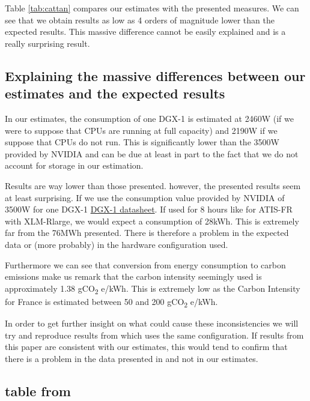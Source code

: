 \documentclass[11pt]{article}
\begin{document}
Table \ref{tab:cattan} compares our estimates with the presented
measures. We can see that we obtain results as low as 4 orders of magnitude
lower than the expected results. This massive difference cannot be
easily explained and is a really surprising result.

\subsection{Explaining the massive differences between our estimates and the expected results}
\label{sec:orgf6de9e8}

In our estimates, the consumption of one DGX-1 is estimated at
2460W (if we were to suppose that CPUs are running at full capacity)
and 2190W if we suppose that CPUs do not run. This is significantly lower than the 3500W provided by NVIDIA
and can be due at least in part to the fact that we do not account for
storage in our estimation.

Results are way lower than those presented. however, the presented
results seem at least surprising. If we use the consumption value
provided by NVIDIA of 3500W for one DGX-1 \href{https://www.nvidia.com/content/dam/en-zz/Solutions/Data-Center/dgx-1/dgx-1-rhel-centos-datasheet-update-r2\_Updates\_NV\_web\_fr\_FR.pdf}{DGX-1 datasheet}. If used for
8 hours like for ATIS-FR with XLM-Rlarge, we would expect a
consumption of 28kWh. This is extremely far from the 76MWh
presented. There is therefore a problem in the expected data or (more
probably) in the hardware configuration used. 

Furthermore we can see that conversion from energy consumption to
carbon emissions make us remark that the carbon intensity seemingly
used is approximately 1.38 gCO\textsubscript{2} e/kWh. This is extremely low as the
Carbon Intensity for France is estimated between 50 and 200 gCO\textsubscript{2}
e/kWh.

In order to get further insight on what could cause these
inconsistencies we will try and reproduce results from
\cite{Cattan2022usability} which uses the same configuration. If
results from this paper are consistent with our estimates, this would
tend to confirm that there is a problem in the data presented in
\cite{Cattan2022benchmarking} and not in our estimates.

\subsection{table from \cite{Cattan2022usability}}
\label{sec:orgba411df}
\end{document}
